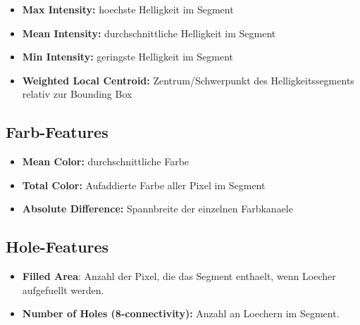 \begin{itemize}
  \item \textbf{Max Intensity:} hoechste Helligkeit im Segment
  \item \textbf{Mean Intensity:} durchschnittliche Helligkeit im Segment
  \item \textbf{Min Intensity:} geringste Helligkeit im Segment
  \item \textbf{Weighted Local Centroid:} Zentrum/Schwerpunkt des Helligkeitssegments relativ zur Bounding Box
\end{itemize}

\subsection{Farb-Features}

\begin{itemize}
  \item \textbf{Mean Color:} durchschnittliche Farbe
  \item \textbf{Total Color:} Aufaddierte Farbe aller Pixel im Segment
  \item \textbf{Absolute Difference:} Spannbreite der einzelnen Farbkanaele
\end{itemize}

\subsection{Hole-Features}

\begin{itemize}
  \item \textbf{Filled Area}: Anzahl der Pixel, die das Segment enthaelt, wenn Loecher aufgefuellt werden.
  \item \textbf{Number of Holes (8-connectivity):} Anzahl an Loechern im Segment.
\end{itemize}
